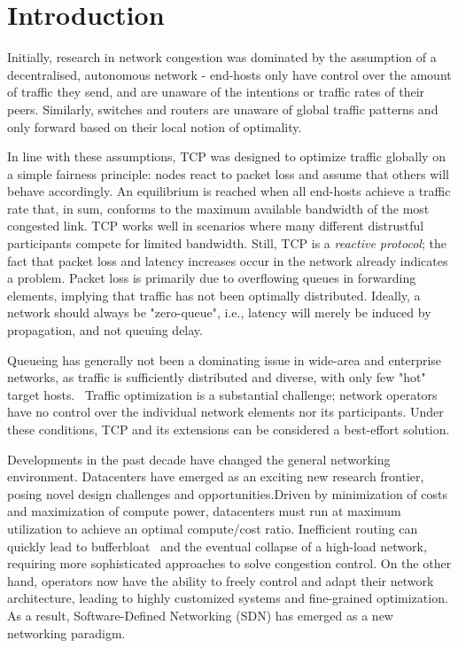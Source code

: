 \documentclass[sigconf]{acmart}
\begin{document}


\maketitle

%
%
%
%
%
%
%

\section{Introduction}
\label{sec:intro}

Initially, research in network congestion was dominated by the assumption of a decentralised, autonomous network - end-hosts only have control over the amount of traffic they send, and are unaware of the intentions or traffic rates of their peers. Similarly, switches and routers are unaware of global traffic patterns and only forward based on their local notion of optimality.

In line with these assumptions, TCP was designed to optimize traffic globally on a simple fairness principle: nodes react to packet loss and assume that others will behave accordingly. An equilibrium is reached when all end-hosts achieve a traffic rate that, in sum, conforms to the maximum available bandwidth of the most congested link.
TCP works well  in scenarios where many different distrustful participants compete for limited bandwidth. Still, TCP is a \textit{reactive protocol}; the fact that packet loss and latency increases occur in the network already indicates a problem. Packet loss is primarily due to overflowing queues in forwarding elements, implying that traffic has not been optimally distributed. Ideally, a network should always be "zero-queue", i.e., latency will merely be induced by propagation, and not queuing delay. 

Queueing has generally not been a dominating issue in wide-area and enterprise networks, as traffic is sufficiently distributed and diverse, with only few "hot" target hosts.~\cite{hedera, microte} Traffic optimization is a substantial challenge; network operators have no control over the individual network elements nor its participants. Under these conditions, TCP and its extensions can be considered a best-effort solution.

Developments in the past decade have changed the general networking environment. Datacenters have emerged as an exciting new research frontier, posing novel design challenges and opportunities.Driven by minimization of costs and maximization of compute power, datacenters must  run at maximum utilization to achieve an optimal compute/cost ratio. Inefficient routing can quickly lead to bufferbloat~\cite{bufferbloat} and the eventual collapse of a high-load network, requiring more sophisticated approaches to solve congestion control. 
On the other hand, operators now have the ability to freely control and adapt their network architecture, leading to highly customized systems and fine-grained optimization. As a result, Software-Defined Networking (SDN) has emerged as a new networking paradigm. 
\end{document}
